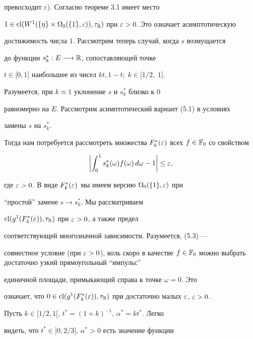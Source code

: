 превосходит $\varepsilon$). Согласно теореме 3.1 имеет место


$1 \in {\cl}({W^1}(\{\eta\} \times {{\Omega}_0}(\{1\},\varepsilon)),


{\tau}_{\Bbb R})$ при $\varepsilon > 0$. Это означает асимптотическую


достижимость числа $1$. Рассмотрим теперь случай, когда $s$ возмущается


до функции ${{s^*_k}:E \longrightarrow {\Bbb R}}$, сопоставляющей точке


$t \in [0,1[$ наибольшее из чисел ${kt},{1 - t};\;k \in [1/2,\;1[$.


Разумеется, при $k \approx 1$ уклонение $s$ и $s^*_k$ близко к $0$


равномерно на $E$. Рассмотрим асимптотический вариант (5.1) в условиях


замены $s$ на $s^*_k$.


Тогда нам потребуется рассмотреть множества $F^*_k(\var)$ всех $f \in \Bbb


F_0$ со свойством


%


\begin{equation}


\biggl| \int_0^1 s^*_k(\omega)f(\omega)\,d\omega -1 \biggr| \le \var,


\end{equation}


%


где $\varepsilon >0$. В виде $F^*_k(\varepsilon)$ мы имеем версию $\Omega_0(\{1\},\varepsilon)$ при


``простой'' замене $s \to s^*_k$. Мы рассматриваем


$\operatorname{cl}(g^1(F^*_k(\varepsilon)),\tau_{\Bbb R})$ при $\varepsilon>0$, а также предел


соответствующей многозначной зависимости. Разумеется, (5.3) ---


совместное условие (при $\var > 0$), коль скоро в качестве $f \in


\Bbb F_0$ можно выбрать достаточно узкий прямоугольный ``импульс''


единичной площади, примыкающий справа к точке $\omega=0$. Это


означает, что $ 0 \in


\cl(g^1(F^*_k(\var)),\tau_{\Bbb R})$ при достаточно малых $\var$, $\var>0$.


Пусть $k \in [1/2,1[$, $t^*=(1+k)^{-1}$, $\alpha^*=kt^*$. Легко


видеть, что $t^* \in ]0,2/3]$, $\alpha^* >0$ есть значение функции


